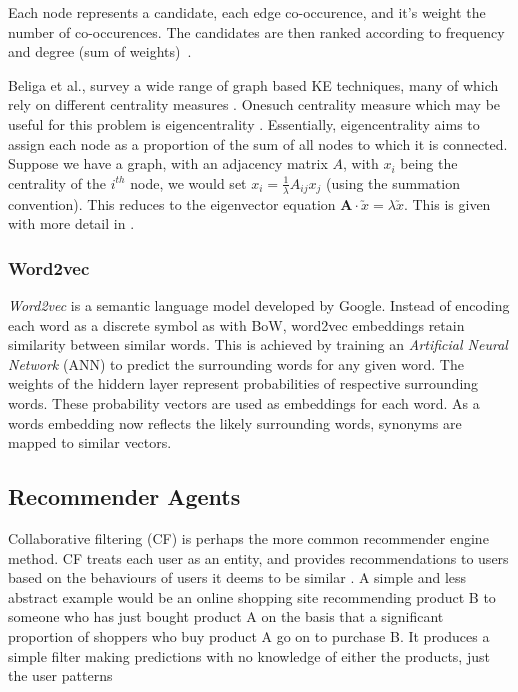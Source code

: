 Each node represents a candidate, each edge co-occurence, and it's weight the number of co-occurences.  The 
candidates are then ranked according to frequency and degree (sum of weights)~\cite{Rose2010}.

Beliga et al., survey a wide range of graph based KE techniques, many of which rely on different 
centrality measures \cite{Beliga2015}. Onesuch centrality measure which may be useful for this problem is 
eigencentrality \cite{Bonacich2007}. Essentially, eigencentrality aims to assign each node as a proportion of the
sum of all nodes to which it is connected.  Suppose we have a graph, with an adjacency matrix $A$, with $x_i$ being
the centrality of the $i^{th}$ node, we would set $x_i = \frac{1}{\lambda}A_{ij}x_j$ (using the summation convention). This
reduces to the eigenvector equation $\textbf{A}\cdot \utilde{x} = \lambda \utilde{x}$. This is given with more detail in 
\cite{Newman2010}.

\subsubsection{Word2vec}\label{ssec:w2v}
\emph{Word2vec} is a semantic language model developed by Google.  Instead of encoding each word as a discrete symbol
as with BoW, word2vec embeddings retain similarity between similar words. This is achieved by training an \emph{Artificial 
Neural Network} (ANN) to predict the surrounding words for any given word.  The weights of the hiddern layer represent
probabilities of respective surrounding words. These probability vectors are used as embeddings for each word. As a words
embedding now reflects the likely surrounding words, synonyms are mapped to similar vectors.
\cite{Mikolov2013, McCormick2017, Liu2020}

\subsection{Recommender Agents}\label{ssec:recommenders}
Collaborative filtering (CF) is perhaps the more common recommender engine method. CF treats each user as an entity, 
and provides recommendations to users based on the behaviours of users it deems to be similar 
\cite{Melville2010, Herlocker2000}. A simple and less abstract example would be an online shopping site recommending
product B to someone who has just bought product A on the basis that a significant proportion of shoppers who buy
product A go on to purchase B.  It produces a simple filter making predictions with no knowledge of either the products,
just the user patterns

